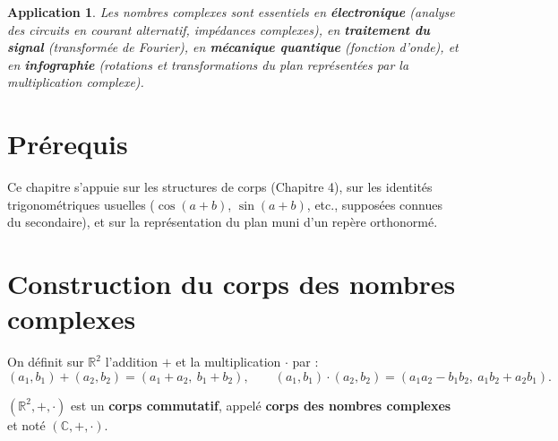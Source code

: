 \documentclass[a4paper,12pt,openany]{book}
\newtheorem{application}{Application}[section]
\begin{document}
\begin{application}
Les nombres complexes sont essentiels en \textbf{électronique} (analyse
des circuits en courant alternatif, impédances complexes), en
\textbf{traitement du signal} (transformée de Fourier), en
\textbf{mécanique quantique} (fonction d'onde), et en \textbf{infographie}
(rotations et transformations du plan représentées par la multiplication
complexe).
\end{application}

\section{Prérequis}

Ce chapitre s'appuie sur les structures de corps (Chapitre 4), sur les
identités trigonométriques usuelles ($\cos(a+b)$, $\sin(a+b)$, etc.,
supposées connues du secondaire), et sur la représentation du plan muni
d'un repère orthonormé.

\section{Construction du corps des nombres complexes}

\begin{definition}
On définit sur $\mathbb{R}^2$ l'addition $+$ et la multiplication $\cdot$
par :
\[
(a_1,b_1) + (a_2,b_2) = (a_1+a_2,\ b_1+b_2), \qquad
(a_1,b_1) \cdot (a_2,b_2) = (a_1a_2-b_1b_2,\ a_1b_2+a_2b_1).
\]
\end{definition}

\begin{theoreme}
$(\mathbb{R}^2,+,\cdot)$ est un \textbf{corps commutatif}, appelé
\textbf{corps des nombres complexes} et noté $(\mathbb{C},+,\cdot)$.
\end{theoreme}
\end{document}
